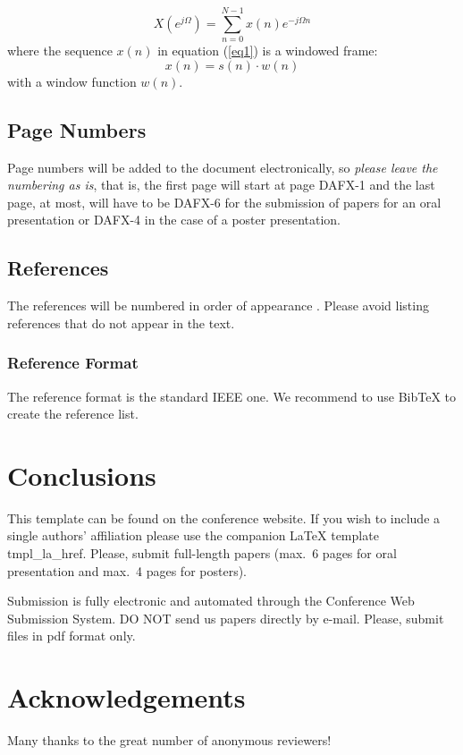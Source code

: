 \documentclass[twoside]{article}
\begin{document}
\begin{equation}
X(e^{j\Omega})=\sum_{n=0}^{N-1}x(n)e^{-j\Omega n}
\label{eq1}
\end{equation}
where the sequence $x(n)$ in equation (\ref{eq1}) is a windowed frame:
\begin{equation}
x(n)=s(n)\cdot w(n)
\label{eq2}
\end{equation}
with a window function $w(n)$.

\subsection{Page Numbers}
Page numbers will be added to the document electronically, so {\em please leave the numbering as is},
that is, the first page will start at page DAFX-1 and the last page, at most, will have to be DAFX-6
for the submission of papers for an oral presentation or DAFX-4 in the case of a poster presentation.

\subsection{References}
The references will be numbered in order of appearance \cite{Serra:1996:sms,Moorer:2000:AES:audio:millenium,Arfib:1998:DAFx,Haykin:1991:adaptive:filter}. Please avoid listing references that do not appear in the text.

\subsubsection{Reference Format}
The reference format is the standard IEEE one. We recommend to use BibTeX to create the reference list.

\section{Conclusions}
This template can be found on the conference website. 
If you wish to include a single authors' affiliation please use the companion LaTeX template tmpl\_la\_href. 
Please, submit full-length papers (max.~6 pages for oral presentation and max.~4 pages for posters).
 
Submission is fully electronic and automated through the Conference Web Submission System. 
DO NOT send us papers directly by e-mail. 
Please, submit files in pdf format only.


\section{Acknowledgements}
Many thanks to the great number of anonymous reviewers!
\end{document}
